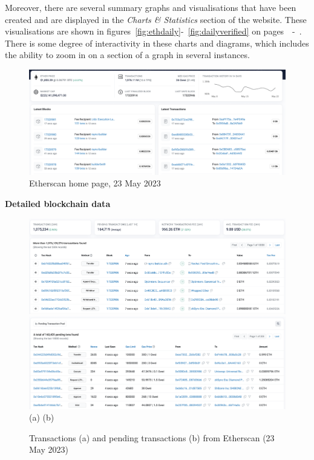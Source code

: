 \documentclass[UTF8]{article}
\begin{document}
Moreover, there are several summary graphs and visualisations that have been created and are displayed in the \textit{Charts \& Statistics} section of the website. These visualisations are shown in figures~\ref{fig:ethdaily}-~\ref{fig:dailyverified} on pages~\pageref{fig:ethdaily}~-~\pageref{fig:dailyverified}. There is some degree of interactivity in these charts and diagrams, which includes the ability to zoom in on a section of a graph in several instances.\\

\begin{figure}[htbp]
\begin{center}
\includegraphics[width=\linewidth]{images/etherscan}
\caption{Etherscan home page, 23 May 2023}
\label{fig:ethscan}
\end{center}
\end{figure}


\textbf{Detailed blockchain data}\\
\begin{figure}[htbp]
\begin{center}
\includegraphics[width=0.48\linewidth]{images/txns}
\includegraphics[width=0.48\linewidth]{images/pendtxns} \\
(a)\hspace{160pt}        (b)\\
\caption{Transactions (a) and pending transactions (b) from Etherscan (23 May 2023)}
\label{fig:txns}
\end{center}
\end{figure}
\end{document}
